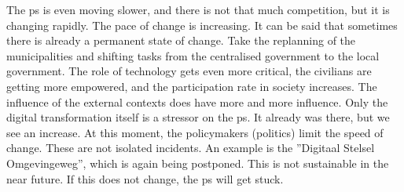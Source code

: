 The \gls{ps} is even moving slower, and there is not that much competition, but it is changing rapidly. The pace of change is increasing. It can be said that sometimes there is already a permanent state of change. Take the replanning of the municipalities and shifting tasks from the centralised government to the local government. The role of technology gets even more critical, the civilians are getting more empowered, and the participation rate in society increases. The influence of the external contexts does have more and more influence. Only the digital transformation itself is a stressor on the \gls{ps}. It already was there, but we see an increase. At this moment, the policymakers (politics) limit the speed of change.
These are not isolated incidents. An example is the ''Digitaal Stelsel Omgevingeweg'', which is again being postponed. This is not sustainable in the near future. If this does not change, the \gls{ps} will get stuck.

